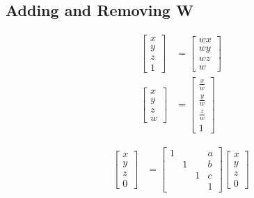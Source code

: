 \subsection{Adding and Removing W}

  \begin{align}
    \begin{bmatrix}
      x \\
      y \\
      z \\
      1
    \end{bmatrix}
    &=
    \begin{bmatrix}
      wx \\
      wy \\
      wz \\
      w
    \end{bmatrix} \\
    \begin{bmatrix}
      x \\
      y \\
      z \\
      w
    \end{bmatrix}
    &=
    \begin{bmatrix}
      \frac{x}{w} \\
      \frac{y}{w} \\
      \frac{z}{w} \\
      1
    \end{bmatrix}
  \end{align}

\begin{align}
  \begin{bmatrix}
    x \\
    y \\
    z \\
    0
  \end{bmatrix}
  &=
  \begin{bmatrix}
    1 & & & a \\
    & 1 & & b \\
    & & 1 & c \\
    & & & 1
  \end{bmatrix}
  \begin{bmatrix}
    x \\
    y \\
    z \\
    0
  \end{bmatrix}
\end{align}
